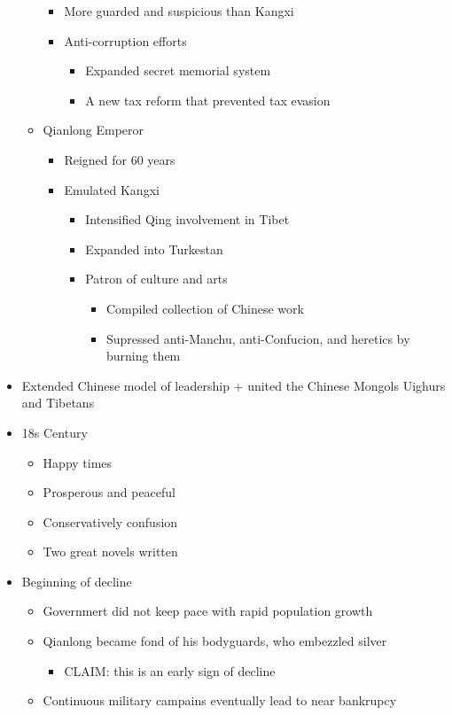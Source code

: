 \documentclass[letterpaper]{article}
\begin{document}
\begin{itemize}
\begin{itemize}
\begin{itemize}
\item More guarded and suspicious than Kangxi
\item Anti-corruption efforts

\begin{itemize}
\item Expanded secret memorial system
\item A new tax reform that prevented tax evasion
\end{itemize}
\end{itemize}

\item Qianlong Emperor

\begin{itemize}
\item Reigned for 60 years
\item Emulated Kangxi

\begin{itemize}
\item Intensified Qing involvement in Tibet
\item Expanded into Turkestan
\item Patron of culture and arts

\begin{itemize}
\item Compiled collection of Chinese work
\item Supressed anti-Manchu, anti-Confucion, and heretics by burning
them
\end{itemize}
\end{itemize}
\end{itemize}
\end{itemize}

\item Extended Chinese model of leadership + united the Chinese Mongols
Uighurs and Tibetans
\item 18s Century

\begin{itemize}
\item Happy times
\item Prosperous and peaceful
\item Conservatively confusion
\item Two great novels written
\end{itemize}

\item Beginning of decline

\begin{itemize}
\item Governmert did not keep pace with rapid population growth
\item Qianlong became fond of his bodyguards, who embezzled silver

\begin{itemize}
\item CLAIM: this is an early sign of decline
\end{itemize}

\item Continuous military campains eventually lead to near bankrupcy
\end{itemize}
\end{itemize}
\end{document}
